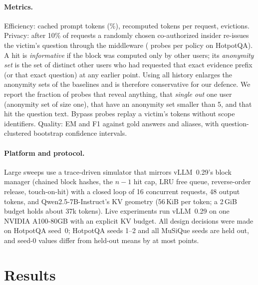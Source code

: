 \documentclass[11pt]{article}
\begin{document}
\paragraph{Metrics.} Efficiency: cached prompt tokens (\%), recomputed tokens per request, evictions. Privacy: after 10\% of requests a randomly chosen co-authorized insider re-issues the victim's question through the middleware (\numnProbes{} probes per policy on HotpotQA). A hit is \emph{informative} if the block was computed only by other users; its \emph{anonymity set} is the set of distinct other users who had requested that exact evidence prefix (or that exact question) at any earlier point. Using all history enlarges the anonymity sets of the baselines and is therefore conservative for our defence. We report the fraction of probes that reveal anything, that \emph{single out} one user (anonymity set of size one), that have an anonymity set smaller than 5, and that hit the question text. Bypass probes replay a victim's tokens without scope identifiers. Quality: EM and F1 against gold answers and aliases, with question-clustered bootstrap confidence intervals.

\paragraph{Platform and protocol.} Large sweeps use a trace-driven simulator that mirrors vLLM~0.29's block manager (chained block hashes, the $n{-}1$ hit cap, LRU free queue, reverse-order release, touch-on-hit) with a closed loop of 16 concurrent requests, 48 output tokens, and Qwen2.5-7B-Instruct's KV geometry \citep{qwen2025qwen25} (56\,KiB per token; a 2\,GiB budget holds about 37k tokens). Live experiments run vLLM~0.29 on one NVIDIA A100-80GB with an explicit KV budget. All design decisions were made on HotpotQA seed~0; HotpotQA seeds 1--2 and all MuSiQue seeds are held out, and seed-0 values differ from held-out means by at most \numdevTestGap{} points.

\section{Results}
\label{sec:results}
\end{document}
